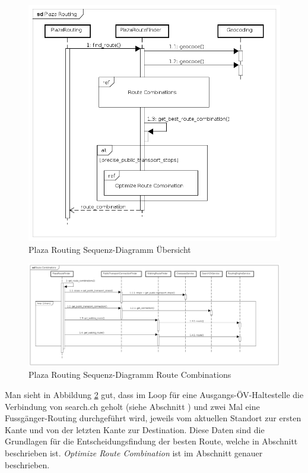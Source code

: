 \begin{figure}[ht]
    \centering
    \includegraphics[width=0.7\linewidth]{projectdoc/img/sequence_diagram_plaza_routing_overview}
    \caption[Plaza Routing Sequenz-Diagramm Übersicht]{Plaza Routing Sequenz-Diagramm Übersicht}
    \label{fig:sequence_diagram_plaza_routing_overview}
\end{figure}

\begin{figure}[ht]
    \centering
    \includegraphics[width=1\linewidth]{projectdoc/img/sequence_diagram_plaza_routing_route_comb}
    \caption[Plaza Routing Sequenz-Diagramm Route Combinations]{Plaza Routing Sequenz-Diagramm Route Combinations}
    \label{fig:sequence_diagram_plaza_routing_route_combs}
\end{figure}

Man sieht in Abbildung \ref{fig:sequence_diagram_plaza_routing_route_combs} gut, dass im Loop für eine Ausgangs-ÖV-Haltestelle die Verbindung von search.ch \cite{search_ch_route_api} geholt (siehe Abschnitt ) und zwei Mal eine Fussgänger-Routing durchgeführt wird, jeweils vom aktuellen Standort zur ersten \gls{Kante} und von der letzten Kante zur Destination. Diese Daten sind die Grundlagen für die Entscheidungsfindung der besten Route, welche in Abschnitt  beschrieben ist. \emph{Optimize Route Combination} ist im Abschnitt  genauer beschrieben.

